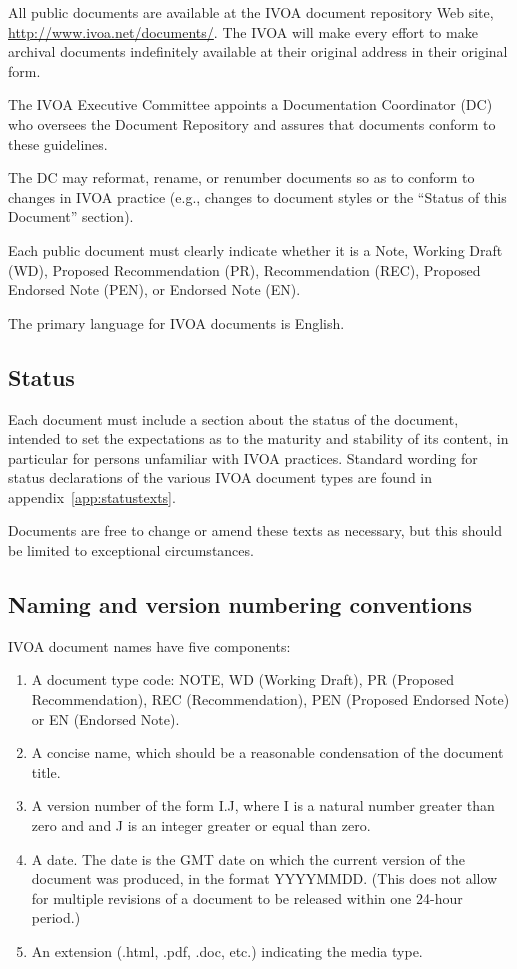 \documentclass[11pt,a4paper]{ivoa}
\begin{document}
All public documents are available at the IVOA document repository Web
site, \url{http://www.ivoa.net/documents/}.  The IVOA will make every effort to
make archival documents indefinitely available at their original address
in their original form.

The IVOA Executive Committee appoints a Documentation Coordinator (DC)
who oversees the Document Repository and assures that documents conform
to these guidelines.

The DC may reformat, rename, or renumber documents so as to conform to
changes in IVOA practice (e.g., changes to document styles or the
“Status of this Document” section).

Each public document must clearly indicate whether it is a Note, Working
Draft (WD), Proposed Recommendation (PR), Recommendation (REC), Proposed
Endorsed Note (PEN), or Endorsed Note (EN).

The primary language for IVOA documents is English.

\subsection{Status}

Each document must include a section about the status of the document,
intended to set the expectations as to the maturity and stability of
its content, in particular for persons unfamiliar with IVOA practices.
Standard wording for status declarations of the various IVOA document
types are found in appendix~\ref{app:statustexts}.

Documents are free to change or amend these texts as necessary, but this
should be limited to exceptional circumstances.

\subsection{Naming and version numbering conventions}

IVOA document names have five components:

\begin{enumerate}
\item A document type code:  NOTE, WD (Working Draft), PR (Proposed
Recommendation), REC (Recommendation), PEN (Proposed Endorsed Note) or EN
(Endorsed Note).

\item A concise name, which should be a reasonable condensation of the
document title.

\item A version number of the form I.J, where I is a natural number
greater than zero and and J is an integer greater or equal than zero.

\item A date.  The date is the GMT date on which the current version of
the document was produced, in the format YYYYMMDD.  (This does not allow
for multiple revisions of a document to be released within one 24-hour
period.)

\item An extension (.html, .pdf, .doc, etc.) indicating the media type.
\end{enumerate}
\end{document}
